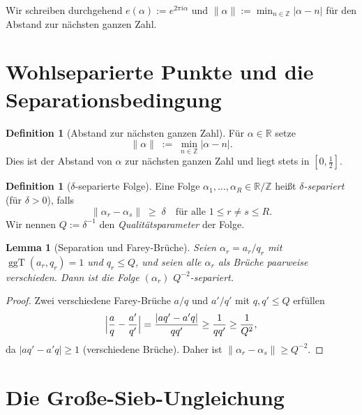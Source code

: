 \documentclass[12pt,a4paper]{amsart}
\newtheorem{lemma}[theorem]{Lemma}
\theoremstyle{definition}
\newtheorem{definition}[theorem]{Definition}
\newcommand{\Z}{\mathbb{Z}}
\newcommand{\R}{\mathbb{R}}
\DeclareMathOperator{\ggT}{ggT}
\newcommand{\eexp}[1]{e\!\left(#1\right)}
\begin{document}
Wir schreiben durchgehend $\eexp{\alpha} := e^{2\pi i\alpha}$ und
$\|\alpha\| := \min_{n\in\Z}|\alpha - n|$ für den Abstand zur nächsten
ganzen Zahl.

\section{Wohlseparierte Punkte und die Separationsbedingung}

\begin{definition}[Abstand zur nächsten ganzen Zahl]
  Für $\alpha \in \R$ setze
  \[
    \|\alpha\| \;:=\; \min_{n \in \Z}|\alpha - n|.
  \]
  Dies ist der Abstand von $\alpha$ zur nächsten ganzen Zahl und liegt
  stets in $[0, \tfrac{1}{2}]$.
\end{definition}

\begin{definition}[$\delta$-separierte Folge]\label{def:separiert}
  Eine Folge $\alpha_1, \ldots, \alpha_R \in \R/\Z$ heißt
  \emph{$\delta$-separiert} (für $\delta > 0$), falls
  \[
    \|\alpha_r - \alpha_s\| \;\geq\; \delta
    \quad \text{für alle } 1 \leq r \neq s \leq R.
  \]
  Wir nennen $Q := \delta^{-1}$ den \emph{Qualitätsparameter} der Folge.
\end{definition}

\begin{lemma}[Separation und Farey-Brüche]\label{lem:farey}
  Seien $\alpha_r = a_r/q_r$ mit $\ggT(a_r, q_r) = 1$ und $q_r \leq Q$,
  und seien alle $\alpha_r$ als Brüche paarweise verschieden.  Dann ist
  die Folge $(\alpha_r)$ $Q^{-2}$-separiert.
\end{lemma}

\begin{proof}
  Zwei verschiedene Farey-Brüche $a/q$ und $a'/q'$ mit $q, q' \leq Q$
  erfüllen
  \[
    \Bigl|\frac{a}{q} - \frac{a'}{q'}\Bigr|
    = \frac{|aq' - a'q|}{qq'}
    \geq \frac{1}{qq'}
    \geq \frac{1}{Q^2},
  \]
  da $|aq' - a'q| \geq 1$ (verschiedene Brüche).  Daher ist
  $\|\alpha_r - \alpha_s\| \geq Q^{-2}$.
\end{proof}

\section{Die Große-Sieb-Ungleichung}
\end{document}
